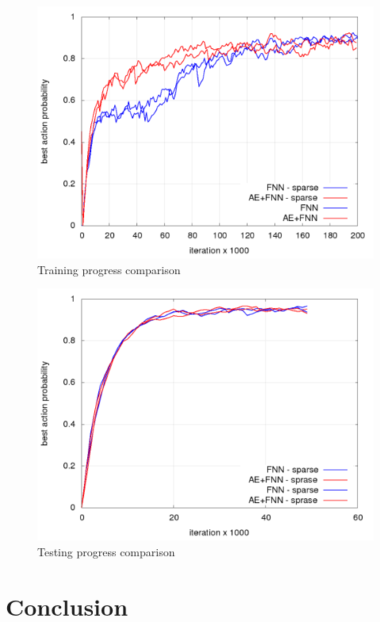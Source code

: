 \documentclass[10pt,a4paper]{article}
\begin{document}
\begin{figure}[!h]
  \centering
  \includegraphics[scale=0.4]{../../results/rl_arcade/training_progress.png}
  \caption{Training progress comparison}
  \label{img:Training progress comparison}
\end{figure}


\begin{figure}[!h]
  \centering
  \includegraphics[scale=0.4]{../../results/rl_arcade/testing_progress.png}
  \caption{Testing progress comparison}
  \label{img:Testing progress comparison}
\end{figure}

\newpage
\section{Conclusion}
\end{document}

